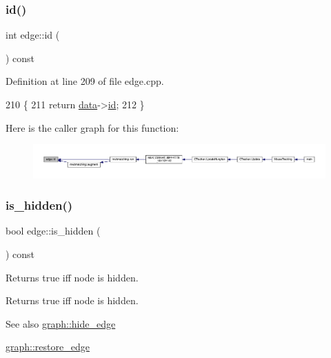 \subsubsection{\texorpdfstring{id()}{id()}}
{\footnotesize\ttfamily int edge\+::id (\begin{DoxyParamCaption}{ }\end{DoxyParamCaption}) const}



Definition at line 209 of file edge.\+cpp.


\begin{DoxyCode}
210 \{
211     \textcolor{keywordflow}{return} \mbox{\hyperlink{classedge_a0ebb6dfa28b77f47529085049352b436}{data}}->\mbox{\hyperlink{classedge__data_a33597ce417f8d86697b03fc8b6fea526}{id}};
212 \}
\end{DoxyCode}
Here is the caller graph for this function\+:\nopagebreak
\begin{figure}[H]
\begin{center}
\leavevmode
\includegraphics[width=350pt]{classedge_aa7635988ab396748d6081ae5d273923b_icgraph}
\end{center}
\end{figure}
\mbox{\label{classedge_ab6d6192a90b1cb77ce9dee2de78d9743}} 
\subsubsection{\texorpdfstring{is\+\_\+hidden()}{is\_hidden()}}
{\footnotesize\ttfamily bool edge\+::is\+\_\+hidden (\begin{DoxyParamCaption}{ }\end{DoxyParamCaption}) const}

Returns true iff node is hidden.

\begin{DoxyReturn}{Returns}
true iff node is hidden. 
\end{DoxyReturn}
\begin{DoxySeeAlso}{See also}
\mbox{\hyperlink{classgraph_ab2f8520bcac080d73c55228fecc61825}{graph\+::hide\+\_\+edge}} 

\mbox{\hyperlink{classgraph_a2e5426682a0897b9f9104b019970bedc}{graph\+::restore\+\_\+edge}} 
\end{DoxySeeAlso}


